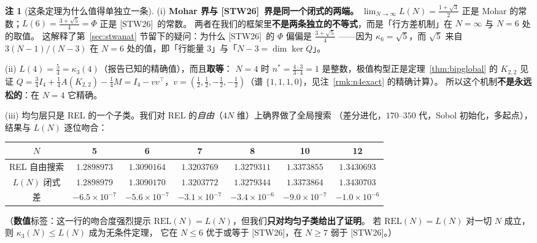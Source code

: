 \documentclass[UTF8,11pt]{ctexart}
\theoremstyle{definition}
\newtheorem{remark}[theorem]{注}
\newcommand{\STW}{\textup{[STW26]}}
\begin{document}
\begin{remark}[这条定理为什么值得单独立一条]\label{rmk:LNread}
(i) \textbf{Mohar 界与 \STW\ 界是同一个闭式的两端。}
$\lim_{N\to\infty}L(N)=\frac{1+\sqrt3}2$ 正是 Mohar 的常数；$L(6)=\frac{3+\sqrt5}4=\Phi$ 正是 \STW\ 的常数。
两者在我们的框架里\textbf{不是两条独立的不等式}，而是「行方差机制」在 $N=\infty$ 与 $N=6$ 处的取值。
这解释了第~\ref{sec:stwanat} 节留下的疑问：为什么 \STW\ 的 $\Phi$ 偏偏是 $\frac{3+\sqrt5}4$
——因为 $\kappa_6=\sqrt5$，而 $\sqrt5$ 来自 $3(N-1)/(N-3)$ 在 $N=6$ 处的值，即「行能量 $3$」与「$N-3=\dim\ker Q$」。

(ii) $L(4)=\frac54=\kappa_3(4)$（报告已知的精确值），而且\textbf{取等}：
$N=4$ 时 $n^*=\frac{4\cdot3}{3\cdot4}=1$ 是整数，极值构型正是定理~\ref{thm:bipglobal} 的
$K_{2,2}$ 见证 $Q=\frac34I_4+\frac14A(K_{2,2})-\frac14M=I_4-vv^\top$，$v=(\frac12,\frac12,-\frac12,-\frac12)$（谱 $\{1,1,1,0\}$，见注~\ref{rmk:n4exact} 的精确计算）。
所以这个机制\textbf{不是永远松的}：在 $N=4$ 它精确。

(iii) 均匀层只是 REL 的一个子类。我们对 REL 的\emph{自由}（$4N$ 维）上确界做了全局搜索
（差分进化，$170$--$350$ 代，Sobol 初始化，多起点），结果与 $L(N)$ 逐位吻合：
\begin{center}\small
\begin{tabular}{c|cccccc}
\toprule
$N$ & 5 & 6 & 7 & 8 & 10 & 12\\
\midrule
REL 自由搜索 & $1.2898973$ & $1.3090164$ & $1.3203769$ & $1.3279311$ & $1.3373855$ & $1.3430693$\\
$L(N)$ 闭式 & $1.2898979$ & $1.3090170$ & $1.3203772$ & $1.3279344$ & $1.3373864$ & $1.3430703$\\
差 & $-6.5\!\times\!10^{-7}$ & $-5.6\!\times\!10^{-7}$ & $-3.1\!\times\!10^{-7}$ & $-3.4\!\times\!10^{-6}$ & $-9.0\!\times\!10^{-7}$ & $-1.0\!\times\!10^{-6}$\\
\bottomrule
\end{tabular}
\end{center}
（\textbf{数值}标签：这一行的吻合度强烈提示 $\mathrm{REL}(N)=L(N)$，但我们\textbf{只对均匀子类给出了证明}。
若 $\mathrm{REL}(N)=L(N)$ 对一切 $N$ 成立，则 $\kappa_3(N)\le L(N)$ 成为无条件定理，
它在 $N\le6$ 优于或等于 \STW，在 $N\ge7$ 弱于 \STW。）
\end{remark}
\end{document}
